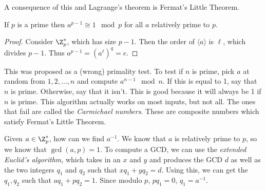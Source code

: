 A consequence of this and Lagrange's theorem is Fermat's Little Theorem.

\begin{theorem}

If $p$ is a prime then $a^{p-1} \cong 1\mod{p}$ for all $a$ relatively prime to $p$.	

\end{theorem}
\begin{proof}
	Consider $\Z_p^*$, which has size $p-1$.  Then the order of $\langle a \rangle $ is $\ell$, which divides $p-1$.  Thus $a^{p-1} = (a^{\ell})^q = e$.
\end{proof}

\begin{example}
This was proposed as a (wrong) primality test.  To test if $n$ is prime, pick $a$ at random from $1,2,\dots, n$ and compute $a^{n-1}\mod n$.  If this is equal to 1, say that $n$ is prime. Otherwise, say that it isn't.  This is good because it will always be 1 if $n$ is prime.  This algorithm actually works on most inputs, but not all.  The ones that fail are called the \textit{Carmichael numbers}.  These are composite numbers which satisfy Fermat's Little Theorem.
\end{example}

\begin{example}
	Given $a\in\Z_p^*$, how can we find $a^{-1}$.  We know that $a$ is relatively prime to $p$, so we know that $\gcd(a,p)=1$.  To compute a GCD, we can use the \textit{extended Euclid's algorithm}, which takes in an $x$ and $y$ and produces the GCD $d$ as well as the two integers $q_1$ and $q_2$ such that $xq_1+yq_2=d$.  Using this, we can get the $q_1,q_2$ such that $aq_1+pq_2 = 1$.  Since modulo $p$, $pq_1=0$, $q_1=a^{-1}$.
\end{example}
